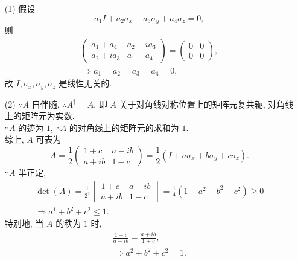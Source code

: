 \documentclass{assignment}
\begin{document}
\begin{pf}
    \begin{itemize}
        \item[(1)] 假设
        \[
            a_1I+a_2\sigma_x+a_3\sigma_y+a_4\sigma_z=0,
        \]
        则
        \begin{gather*}
            \begin{pmatrix}
                a_1+a_4&a_2-ia_3\\
                a_2+ia_3&a_1-a_4
            \end{pmatrix}=\begin{pmatrix}
                0&0\\
                0&0
            \end{pmatrix},\\
            \Longrightarrow a_1=a_2=a_3=a_4=0,
        \end{gather*}
        故 $I,\sigma_x,\sigma_y,\sigma_z$ 是线性无关的.
        \item[(2)] $\because A$ 自伴随, $\therefore A^{\dagger}=A$, 即 $A$ 关于对角线对称位置上的矩阵元复共轭, 对角线上的矩阵元为实数.\\
        $\because A$ 的迹为 $1$, $\therefore A$ 的对角线上的矩阵元的求和为 $1$.\\
        综上, $A$ 可表为
        \[
            A=\frac{1}{2}\begin{pmatrix}
                1+c&a-ib\\
                a+ib&1-c
            \end{pmatrix}=\frac{1}{2}(I+a\sigma_x+b\sigma_y+c\sigma_z).
        \]
        $\because A$ 半正定,
        \begin{gather*}
            \det(A)=\frac{1}{2^2}\begin{vmatrix}
                1+c&a-ib\\
                a+ib&1-c
            \end{vmatrix}=\frac{1}{4}(1-a^2-b^2-c^2)\geq 0\\
            \Longrightarrow a^1+b^2+c^2\leq 1.
        \end{gather*}
        特别地, 当 $A$ 的秩为 $1$ 时,
        \begin{gather}
            \frac{1-c}{a-ib}=\frac{a+ib}{1+c},\\
            \Longrightarrow a^2+b^2+c^2=1.
        \end{gather}
    \end{itemize}
\end{pf}
\end{document}
